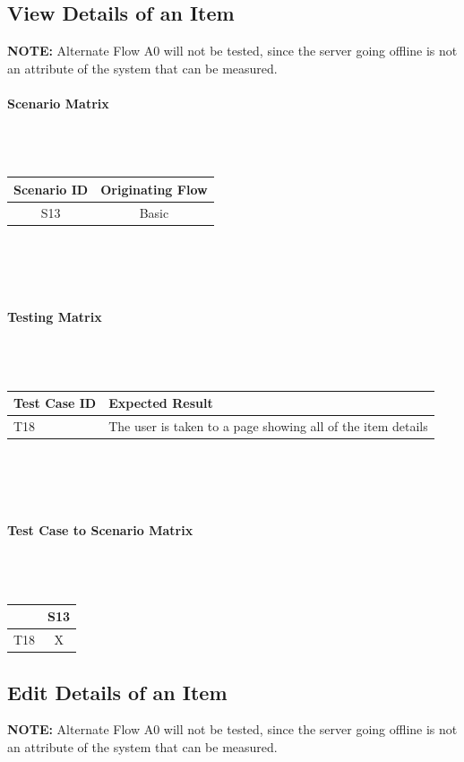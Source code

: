 \documentclass{article}
\begin{document}
\subsection{View Details of an Item}
\textbf{NOTE:} Alternate Flow A0 will not be tested, since the server going offline is not an attribute of the system that can be measured.

\paragraph{Scenario Matrix}~\\ \\
\begin{tabular}{ c  c }
\hline
Scenario ID & Originating Flow\\
\hline
\hline
S13 & Basic\\
\hline
\end{tabular}\\
~\\
~\\
\paragraph{Testing Matrix}~\\ \\
\begin{tabular}{ p{0.8in}  p{3.4in} }
\hline
Test Case ID & Expected Result\\
\hline
\hline
T18 & The user is taken to a page showing all of the item details\\
\hline
\end{tabular}\\
~\\
~\\
\paragraph{Test Case to Scenario Matrix}~\\ \\
\begin{tabular}{ | c || c | }
\hline
    & S13 \\
\hline
\hline
T18 &  X  \\
\hline
\end{tabular}

\subsection{Edit Details of an Item}
\textbf{NOTE:} Alternate Flow A0 will not be tested, since the server going offline is not an attribute of the system that can be measured.
\end{document}

